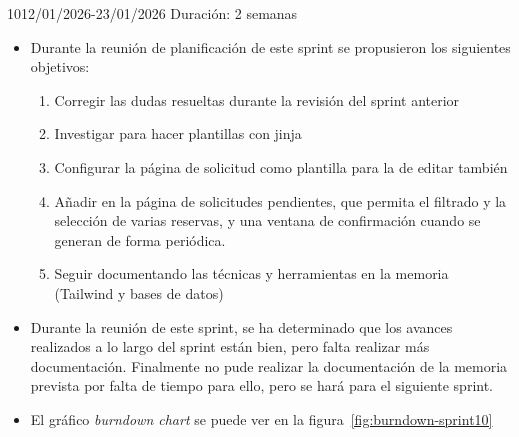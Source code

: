 \begin{Sprint}{10}{12/01/2026-23/01/2026}
	Duración: 2 semanas
	\begin{itemize}	
		\item{}
		Durante la reunión de planificación de este sprint se propusieron los siguientes objetivos:
		\begin{enumerate}
			\item Corregir las dudas resueltas durante la revisión del sprint anterior
			\item Investigar para hacer plantillas con jinja
			\item Configurar la página de solicitud como plantilla para la de editar también
			\item Añadir en la página de solicitudes pendientes, que permita el filtrado y la selección de varias reservas, y una ventana de confirmación cuando se generan de forma periódica.
			\item Seguir documentando las técnicas y herramientas en la memoria (Tailwind y bases de datos)
		\end{enumerate}
		\item{}
		Durante la reunión de este sprint, se ha determinado que los avances realizados a lo largo del sprint están bien, pero falta realizar más documentación. Finalmente no pude realizar la documentación de la memoria prevista por falta de tiempo para ello, pero se hará para el siguiente sprint.
		
		\item{}
		El gráfico \textit{burndown chart} se puede ver en la figura~\ref{fig:burndown-sprint10}
	\end{itemize}
\end{Sprint}

